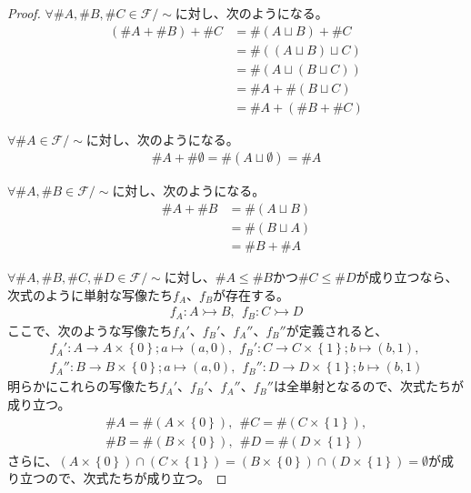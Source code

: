 \documentclass[dvipdfmx]{jsarticle}
\begin{document}
\begin{proof}
$\forall\# A,\# B,\# C \in \mathcal{F} /\sim $に対し、次のようになる。
\begin{align*}
\left( \# A + \# B \right) + \# C &= \# (A \sqcup B) + \# C\\
&= \# \left( (A \sqcup B) \sqcup C \right)\\
&= \# \left( A \sqcup (B \sqcup C) \right)\\
&= \# A + \# (B \sqcup C)\\
&= \# A + \left( \# B + \# C \right)
\end{align*}\par
$\forall\# A \in \mathcal{F} /\sim $に対し、次のようになる。
\begin{align*}
\# A + \# \emptyset  = \# (A \sqcup \emptyset ) = \# A
\end{align*}\par
$\forall\# A,\# B \in \mathcal{F} /\sim $に対し、次のようになる。
\begin{align*}
\# A + \# B &= \# (A \sqcup B)\\
&= \# (B \sqcup A)\\
&= \# B + \# A
\end{align*}\par
$\forall\# A,\# B,\# C,\# D \in \mathcal{F} /\sim $に対し、$\# A \leq \# B$かつ$\# C \leq \# D$が成り立つなら、次式のように単射な写像たち$f_{A}$、$f_{B}$が存在する。
\begin{align*}
f_{A}:A \rightarrowtail B,\ \ f_{B}:C \rightarrowtail D
\end{align*}
ここで、次のような写像たち$f_{A}'$、$f_{B}'$、$f_{A}''$、$f_{B}''$が定義されると、
\begin{align*}
f_{A}':A \rightarrow A \times \left\{ 0 \right\};a \mapsto (a,0),\ \ f_{B}':C \rightarrow C \times \left\{ 1 \right\};b \mapsto (b,1),\\
f_{A}'':B \rightarrow B \times \left\{ 0 \right\};a \mapsto (a,0),\ \ f_{B}'':D \rightarrow D \times \left\{ 1 \right\};b \mapsto (b,1)
\end{align*}
明らかにこれらの写像たち$f_{A}'$、$f_{B}'$、$f_{A}''$、$f_{B}''$は全単射となるので、次式たちが成り立つ。
\begin{align*}
\# A = \# \left( A \times \left\{ 0 \right\} \right),\ \ \# C = \# \left( C \times \left\{ 1 \right\} \right),\\
\# B = \# \left( B \times \left\{ 0 \right\} \right),\ \ \# D = \# \left( D \times \left\{ 1 \right\} \right)
\end{align*}
さらに、$\left( A \times \left\{ 0 \right\} \right) \cap \left( C \times \left\{ 1 \right\} \right) = \left( B \times \left\{ 0 \right\} \right) \cap \left( D \times \left\{ 1 \right\} \right) = \emptyset $が成り立つので、次式たちが成り立つ。

\end{proof}
\end{document}
